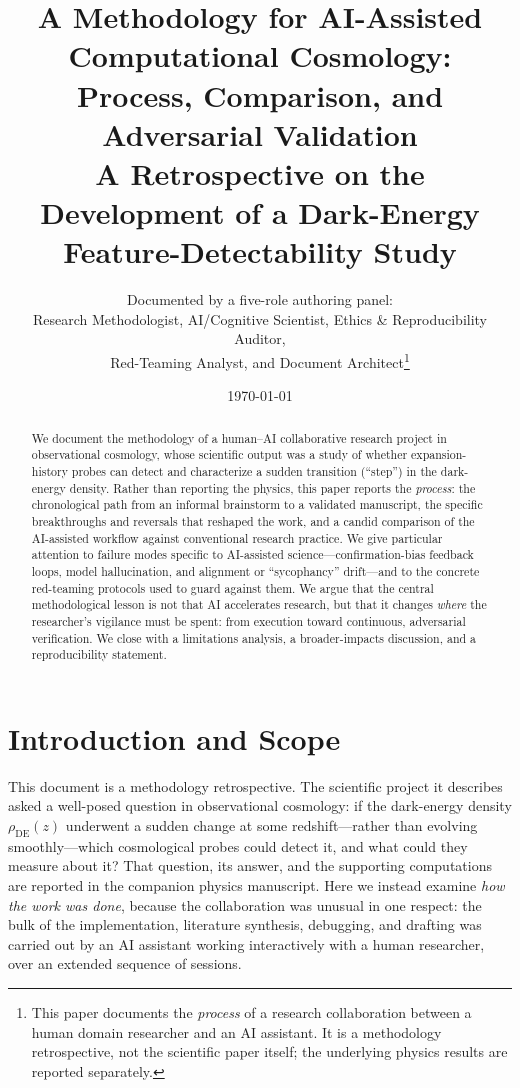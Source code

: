 \documentclass[11pt]{article}
\title{\bfseries A Methodology for AI-Assisted Computational Cosmology:\\
Process, Comparison, and Adversarial Validation\\[0.4em]
\large A Retrospective on the Development of a Dark-Energy\\
Feature-Detectability Study}
\author{%
Documented by a five-role authoring panel:\\
Research Methodologist, AI/Cognitive Scientist, Ethics \& Reproducibility Auditor,\\
Red-Teaming Analyst, and Document Architect\thanks{This paper documents the
\emph{process} of a research collaboration between a human domain researcher and
an AI assistant. It is a methodology retrospective, not the scientific paper
itself; the underlying physics results are reported separately.}}
\date{\today}
\newcommand{\rhoDE}{\rho_{\mathrm{DE}}}
\begin{document}
\maketitle

\begin{abstract}
We document the methodology of a human--AI collaborative research project in
observational cosmology, whose scientific output was a study of whether
expansion-history probes can detect and characterize a sudden transition
(``step'') in the dark-energy density. Rather than reporting the physics, this
paper reports the \emph{process}: the chronological path from an informal
brainstorm to a validated manuscript, the specific breakthroughs and reversals
that reshaped the work, and a candid comparison of the AI-assisted workflow
against conventional research practice. We give particular attention to failure
modes specific to AI-assisted science---confirmation-bias feedback loops, model
hallucination, and alignment or ``sycophancy'' drift---and to the concrete
red-teaming protocols used to guard against them. We argue that the central
methodological lesson is not that AI accelerates research, but that it changes
\emph{where} the researcher's vigilance must be spent: from execution toward
continuous, adversarial verification. We close with a limitations analysis,
a broader-impacts discussion, and a reproducibility statement.
\end{abstract}

\tableofcontents
\bigskip

\section{Introduction and Scope}
\label{sec:intro}

This document is a methodology retrospective. The scientific project it describes
asked a well-posed question in observational cosmology: if the dark-energy density
$\rhoDE(z)$ underwent a sudden change at some redshift---rather than evolving
smoothly---which cosmological probes could detect it, and what could they measure
about it? That question, its answer, and the supporting computations are reported
in the companion physics manuscript. Here we instead examine \emph{how the work
was done}, because the collaboration was unusual in one respect: the bulk of the
implementation, literature synthesis, debugging, and drafting was carried out by
an AI assistant working interactively with a human researcher, over an extended
sequence of sessions.
\end{document}
